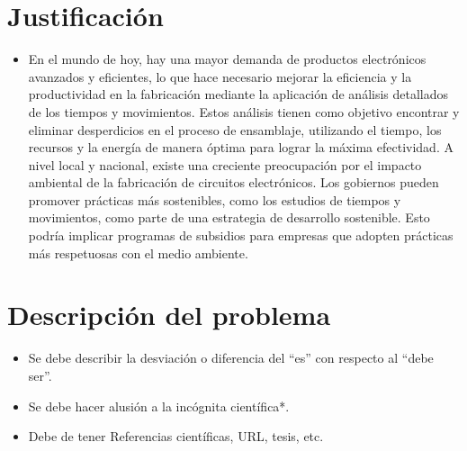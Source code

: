     \section{Justificación}
    
    \begin{itemize}
    \item En el mundo de hoy, hay una mayor demanda de productos electrónicos avanzados y eficientes, lo que hace necesario mejorar la eficiencia y la productividad en la fabricación mediante la aplicación de análisis detallados de los tiempos y movimientos. Estos análisis tienen como objetivo encontrar y eliminar desperdicios en el proceso de ensamblaje, utilizando el tiempo, los recursos y la energía de manera óptima para lograr la máxima efectividad.
    A nivel local y nacional, existe una creciente preocupación por el impacto ambiental de la fabricación de circuitos electrónicos. Los gobiernos pueden promover prácticas más sostenibles, como los estudios de tiempos y movimientos, como parte de una estrategia de desarrollo sostenible. Esto podría implicar programas de subsidios para empresas que adopten prácticas más respetuosas con el medio ambiente.
    \end{itemize}
    \section{Descripción del problema}
    \begin{itemize}
        \item Se debe describir la desviación o diferencia del ``es'' con respecto al ``debe ser''.
        \item Se debe hacer alusión a la incógnita científica*.
        \item Debe de tener Referencias científicas, URL, tesis, etc.
    \end{itemize}
    
